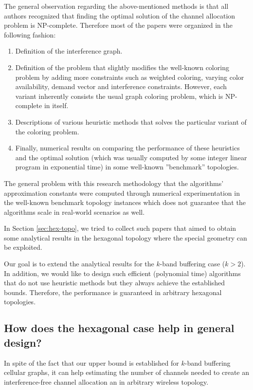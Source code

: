 \documentclass[a4paper, 12pt]{article}
\begin{document}
The general observation regarding the above-mentioned methods is that all authors recognized that finding the optimal solution of the channel allocation problem is NP-complete. Therefore most of the papers were organized in the following fashion:

\begin{enumerate}
\item Definition of the interference graph.
\item Definition of the problem that slightly modifies the well-known coloring problem by adding more constraints such as weighted coloring, varying color availability, demand vector and interference constraints. However, each variant inherently consists the usual graph coloring problem, which is NP-complete in itself.
\item Descriptions of various heuristic methods that solves the particular variant of the coloring problem.
\item Finally, numerical results on comparing the performance of these heuristics and the optimal solution (which was usually computed by some integer linear program in exponential time) in some well-known ''benchmark'' topologies.
\end{enumerate}
The general problem with this research methodology that the algorithms' approximation constants were computed through numerical experimentation in the well-known benchmark topology instances which does not guarantee that the algorithms scale in real-world scenarios as well.

In Section \ref{sec:hex-topo}, we tried to collect such papers that aimed to obtain some analytical results in the hexagonal topology where the special geometry can be exploited. 

Our goal is to extend the analytical results for the $k$-band buffering case ($k>2$). In addition, we would like to design such efficient (polynomial time) algorithms that do not use heuristic methods but they always achieve the established bounds. Therefore, the performance is guaranteed in arbitrary hexagonal topologies.
\subsection{How does the hexagonal case help in general design?}
In spite of the fact that our upper bound is established for $k$-band buffering cellular graphs, it can help estimating the number of channels needed to create an interference-free channel allocation an in arbitrary wireless topology. 
\end{document}

